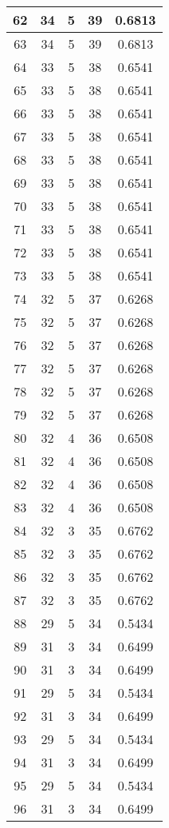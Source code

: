 \documentclass[letterpaper, 12pt]{article}
\begin{document}
\begin{longtable}{|c|c|c|c|c|}
\hline
62 & 34 & 5 & 39 & 0.6813 \\
\hline
63 & 34 & 5 & 39 & 0.6813 \\
\hline
64 & 33 & 5 & 38 & 0.6541 \\
\hline
65 & 33 & 5 & 38 & 0.6541 \\
\hline
66 & 33 & 5 & 38 & 0.6541 \\
\hline
67 & 33 & 5 & 38 & 0.6541 \\
\hline
68 & 33 & 5 & 38 & 0.6541 \\
\hline
69 & 33 & 5 & 38 & 0.6541 \\
\hline
70 & 33 & 5 & 38 & 0.6541 \\
\hline
71 & 33 & 5 & 38 & 0.6541 \\
\hline
72 & 33 & 5 & 38 & 0.6541 \\
\hline
73 & 33 & 5 & 38 & 0.6541 \\
\hline
74 & 32 & 5 & 37 & 0.6268 \\
\hline
75 & 32 & 5 & 37 & 0.6268 \\
\hline
76 & 32 & 5 & 37 & 0.6268 \\
\hline
77 & 32 & 5 & 37 & 0.6268 \\
\hline
78 & 32 & 5 & 37 & 0.6268 \\
\hline
79 & 32 & 5 & 37 & 0.6268 \\
\hline
80 & 32 & 4 & 36 & 0.6508 \\
\hline
81 & 32 & 4 & 36 & 0.6508 \\
\hline
82 & 32 & 4 & 36 & 0.6508 \\
\hline
83 & 32 & 4 & 36 & 0.6508 \\
\hline
84 & 32 & 3 & 35 & 0.6762 \\
\hline
85 & 32 & 3 & 35 & 0.6762 \\
\hline
86 & 32 & 3 & 35 & 0.6762 \\
\hline
87 & 32 & 3 & 35 & 0.6762 \\
\hline
88 & 29 & 5 & 34 & 0.5434 \\
\hline
89 & 31 & 3 & 34 & 0.6499 \\
\hline
90 & 31 & 3 & 34 & 0.6499 \\
\hline
91 & 29 & 5 & 34 & 0.5434 \\
\hline
92 & 31 & 3 & 34 & 0.6499 \\
\hline
93 & 29 & 5 & 34 & 0.5434 \\
\hline
94 & 31 & 3 & 34 & 0.6499 \\
\hline
95 & 29 & 5 & 34 & 0.5434 \\
\hline
96 & 31 & 3 & 34 & 0.6499 \\

\end{longtable}
\end{document}
